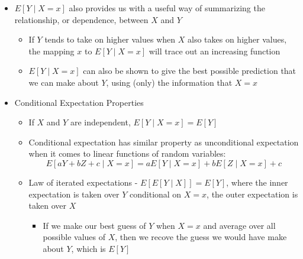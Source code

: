 \documentclass{article}
\begin{document}
\begin{itemize}
\[\begin{array}{cc}
        \sum_{\text{all y}} y \cdot p_{Y \mid X} (y) & Y \text{ is discrete} \\
        \sum_{-\infty}^\infty y \cdot f_{Y \mid X} (y) dy & Y \text{ is continuous}
    \end{array} \\
    \right.
    \]
    \begin{itemize}
        \item We can interpret it as the average value of $Y$ given $X=x$
    \end{itemize}
    \item $E[Y \mid X=x]$ also provides us with a useful way of summarizing the relationship, or dependence, between $X$ and $Y$
    \begin{itemize}
        \item If $Y$ tends to take on higher values when $X$ also takes on higher values, the mapping $x$ to $E[Y \mid X=x]$ will trace out an increasing function
        \item $E[Y \mid X=x]$ can also be shown to give the best possible prediction that we can make about $Y$, using (only) the information that $X=x$
    \end{itemize}
    \item Conditional Expectation Properties
    \begin{itemize}
        \item If $X$ and $Y$ are independent, $E[Y \mid X=x] = E[Y]$
        \item Conditional expectation has similar property as unconditional expectation when it comes to linear functions of random variables:
        \[ E[aY+bZ + c \mid X=x] = aE[Y \mid X=x] + bE[Z \mid X=x] +c
        \]
        \item Law of iterated expectations - $E[E[Y \mid X]] = E[Y]$, where the inner expectation is taken over $Y$ conditional on $X=x$, the outer expectation is taken over $X$
        \begin{itemize}
            \item If we make our best guess of $Y$ when $X=x$ and average over all possible values of $X$, then we recove the guess we would have make about $Y$, which is $E[Y]$
        \end{itemize}
    \end{itemize}

\end{itemize}
\end{document}

